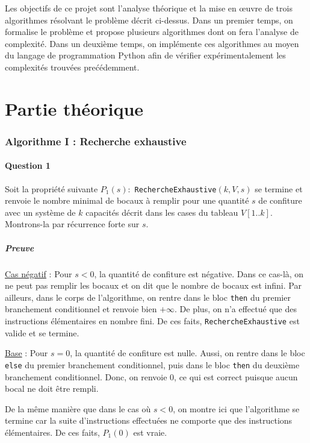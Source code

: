 \documentclass[12pt,a4paper]{article}
\begin{document}
\bigskip
Les objectifs de ce projet sont l'analyse th\'eorique et la mise en \oe uvre de trois algorithmes r\'esolvant le probl\`eme d\'ecrit ci-dessus. Dans un premier temps, on formalise le probl\`eme et propose plusieurs algorithmes dont on fera l'analyse de complexit\'e. Dans un deuxi\`eme temps, on impl\'emente ces algorithmes au moyen du langage de programmation Python afin de v\'erifier exp\'erimentalement les complexit\'es trouv\'ees pre\'c\'edemment.

\newpage
\part{Partie th\'eorique}

\section{Algorithme I : Recherche exhaustive}

\subsection*{Question 1}
Soit la propri\'et\'e suivante \( P_{1}(s) : \) \texttt{RechercheExhaustive}$(k,V,s)$ se termine et renvoie le nombre minimal de bocaux \`a remplir pour une quantit\'e $s$ de confiture avec un syst\`eme de $k$ capacit\'es d\'ecrit dans les cases du tableau $V[1..k]$.
Montrons-la par r\'ecurrence forte sur $s$.

\subsubsection*{Preuve}
\underline{Cas n\'egatif} : Pour $s < 0$, la quantit\'e de confiture est n\'egative. Dans ce cas-l\`a, on ne peut pas remplir les bocaux et on dit que le nombre de bocaux est infini. 
Par ailleurs, dans le corps de l'algorithme, on rentre dans le bloc \texttt{then} du premier branchement conditionnel et renvoie bien $+\infty$. De plus, on n'a effectu\'e que des instructions \'el\'ementaires en nombre fini.
De ces faits, \texttt{RechercheExhaustive} est valide et se termine.

\medskip
\underline{Base} : Pour \( s = 0\), la quantit\'e de confiture est nulle. Aussi, on rentre dans le bloc \texttt{else} du premier branchement conditionnel, puis dans le bloc \texttt{then} du deuxi\`eme branchement conditionnel. Donc, on renvoie $0$, ce qui est correct puisque aucun bocal ne doit \^etre rempli.

De la m\^eme mani\`ere que dans le cas o\`u $s<0$, on montre ici que l'algorithme se termine car la suite d'instructions effectu\'ees ne comporte que des instructions \'el\'ementaires.
De ces faits, $P_{1}(0)$ est vraie.
\end{document}
